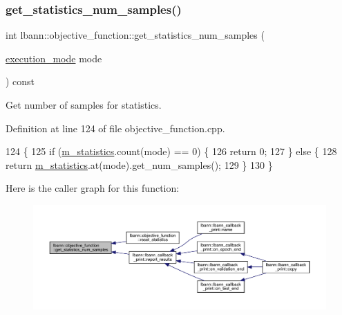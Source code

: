 \subsubsection{\texorpdfstring{get\+\_\+statistics\+\_\+num\+\_\+samples()}{get\_statistics\_num\_samples()}}
{\footnotesize\ttfamily int lbann\+::objective\+\_\+function\+::get\+\_\+statistics\+\_\+num\+\_\+samples (\begin{DoxyParamCaption}\item[{\hyperlink{base_8hpp_a2781a159088df64ed7d47cc91c4dc0a8}{execution\+\_\+mode}}]{mode }\end{DoxyParamCaption}) const}

Get number of samples for statistics. 

Definition at line 124 of file objective\+\_\+function.\+cpp.


\begin{DoxyCode}
124                                                                             \{
125   \textcolor{keywordflow}{if} (\hyperlink{classlbann_1_1objective__function_ad5daa18c52374a849c6fbd515bcc1eb1}{m\_statistics}.count(mode) == 0) \{
126     \textcolor{keywordflow}{return} 0;
127   \} \textcolor{keywordflow}{else} \{
128     \textcolor{keywordflow}{return} \hyperlink{classlbann_1_1objective__function_ad5daa18c52374a849c6fbd515bcc1eb1}{m\_statistics}.at(mode).get\_num\_samples();
129   \}
130 \}
\end{DoxyCode}
Here is the caller graph for this function\+:\nopagebreak
\begin{figure}[H]
\begin{center}
\leavevmode
\includegraphics[width=350pt]{classlbann_1_1objective__function_a19078ce481d321627adfe0151112602e_icgraph}
\end{center}
\end{figure}
\mbox{\label{classlbann_1_1objective__function_a510544e9e511be54a50efd39226de345}} 
